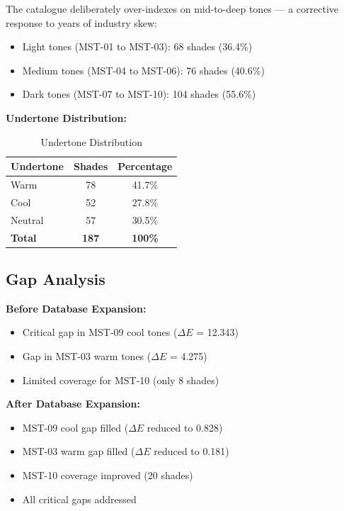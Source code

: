 The catalogue deliberately over-indexes on mid-to-deep tones — a corrective response to years of industry skew:

\begin{itemize}
    \item Light tones (MST-01 to MST-03): 68 shades (36.4\%)
    \item Medium tones (MST-04 to MST-06): 76 shades (40.6\%)
    \item Dark tones (MST-07 to MST-10): 104 shades (55.6\%)
\end{itemize}

\textbf{Undertone Distribution:}

\begin{table}[h]
\centering
\begin{tabular}{|l|c|c|}
\hline
\textbf{Undertone} & \textbf{Shades} & \textbf{Percentage} \\
\hline
Warm & 78 & 41.7\% \\
Cool & 52 & 27.8\% \\
Neutral & 57 & 30.5\% \\
\hline
\textbf{Total} & \textbf{187} & \textbf{100\%} \\
\hline
\end{tabular}
\caption{Undertone Distribution}
\end{table}

\subsection{Gap Analysis}

\textbf{Before Database Expansion:}
\begin{itemize}
    \item Critical gap in MST-09 cool tones ($\Delta E$ = 12.343)
    \item Gap in MST-03 warm tones ($\Delta E$ = 4.275)
    \item Limited coverage for MST-10 (only 8 shades)
\end{itemize}

\textbf{After Database Expansion:}
\begin{itemize}
    \item MST-09 cool gap filled ($\Delta E$ reduced to 0.828)
    \item MST-03 warm gap filled ($\Delta E$ reduced to 0.181)
    \item MST-10 coverage improved (20 shades)
    \item All critical gaps addressed
\end{itemize}

